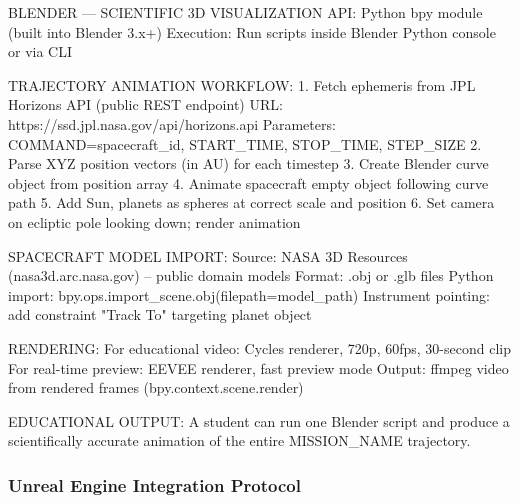 \documentclass[11pt,letterpaper]{article}
\begin{document}
\begin{simplatbox}{BLENDER --- SCIENTIFIC 3D VISUALIZATION}
API: Python bpy module (built into Blender 3.x+)
Execution: Run scripts inside Blender Python console or via CLI

TRAJECTORY ANIMATION WORKFLOW:
  1. Fetch ephemeris from JPL Horizons API (public REST endpoint)
     URL: https://ssd.jpl.nasa.gov/api/horizons.api
     Parameters: COMMAND=spacecraft\_id, START\_TIME, STOP\_TIME, STEP\_SIZE
  2. Parse XYZ position vectors (in AU) for each timestep
  3. Create Blender curve object from position array
  4. Animate spacecraft empty object following curve path
  5. Add Sun, planets as spheres at correct scale and position
  6. Set camera on ecliptic pole looking down; render animation

SPACECRAFT MODEL IMPORT:
  Source: NASA 3D Resources (nasa3d.arc.nasa.gov) -- public domain models
  Format: .obj or .glb files
  Python import: bpy.ops.import\_scene.obj(filepath=model\_path)
  Instrument pointing: add constraint "Track To" targeting planet object

RENDERING:
  For educational video: Cycles renderer, 720p, 60fps, 30-second clip
  For real-time preview: EEVEE renderer, fast preview mode
  Output: ffmpeg video from rendered frames (bpy.context.scene.render)

EDUCATIONAL OUTPUT:
  A student can run one Blender script and produce a scientifically
  accurate animation of the entire {MISSION\_NAME} trajectory.
\end{simplatbox}

\subsubsection{Unreal Engine Integration Protocol}
\end{document}
